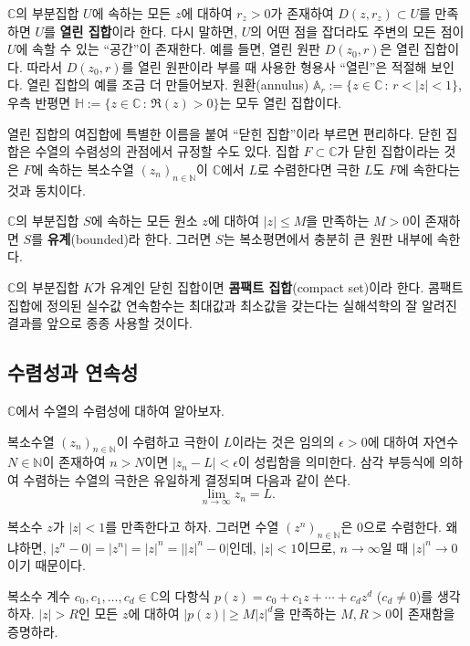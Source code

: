 $\mathbb C$의 부분집합 $U$에 속하는
모든 $z$에 대하여 $r_z>0$가 존재하여 $D(z,r_z)\subset U$를 만족하면
$U$를 {\bf 열린 집합}이라 한다.
다시 말하면, $U$의 어떤 점을 잡더라도 
주변의 모든 점이 $U$에 속할 수 있는 ``공간''이 존재한다.
예를 들면, 열린 원판 $D(z_0,r)$은 열린 집합이다.
따라서  $D(z_0,r)$를 열린 원판이라 부를 때 사용한 형용사 ``열린''은 적절해 보인다.
열린 집합의 예를 조금 더 만들어보자.
원환(annulus) $\mathbb A_r := \{ z\in\mathbb C\,:\, r<|z|<1\}$,
우측 반평면 $\mathbb H:= \{z\in\mathbb C\,:\, \Re(z)>0\}$는 모두 열린 집합이다.

열린 집합의 여집합에 특별한 이름을 붙여 ``닫힌 집합''이라 부르면 편리하다.
닫힌 집합은 수열의 수렴성의 관점에서 규정할 수도 있다.
집합 $F\subset \mathbb C$가 닫힌 집합이라는 것은
$F$에 속하는 복소수열 $(z_n)_{n\in\mathbb N}$이  $\mathbb C$에서 $L$로 수렴한다면
극한 $L$도 $F$에 속한다는 것과 동치이다.

$\mathbb C$의 부분집합 $S$에 속하는 모든 원소 $z$에 대하여
$|z|\le M$을 만족하는 $M>0$이 존재하면 $S$를 {\bf 유계}(bounded)라 한다.
그러면 $S$는 복소평면에서 충분히 큰 원판 내부에 속한다.

$\mathbb C$의 부분집합 $K$가 유계인 닫힌 집합이면 {\bf 콤팩트 집합}(compact set)이라 한다.
콤팩트 집합에 정의된 실수값 연속함수는 최대값과 최소값을 갖는다는
실해석학의 잘 알려진 결과를
앞으로 종종 사용할 것이다.

\subsection{수렴성과 연속성}

$\mathbb C$에서 수열의 수렴성에 대하여 알아보자.
 
복소수열 $(z_n)_{n\in\mathbb N}$이 수렴하고 극한이 $L$이라는 것은
임의의 $\epsilon>0$에 대하여 자연수 $N\in\mathbb N$이 존재하여
 $n>N$이면 $|z_n -L| < \epsilon$이 성립함을 의미한다.
삼각 부등식에 의하여 수렴하는 수열의 극한은 유일하게 결정되며
다음과 같이 쓴다.
$$
\lim_{n\to\infty} z_n = L.
$$

\begin{saltexample}[label=example-1-1]{}{}
복소수 $z$가 $|z|<1$를 만족한다고 하자.
그러면 수열 $(z^n)_{n\in\mathbb N}$은 $0$으로 수렴한다.
왜냐하면, $|z^n-0| = |z^n| = |z|^n = \big||z|^n-0\big|$인데,
$|z|<1$이므로, $n\to\infty$일 때 $|z|^n\to0$이기 때문이다.
\end{saltexample}

\begin{salt_exercise} \label{ex-1-24}
복소수 계수 $c_0, c_1, \ldots, c_d\in \mathbb C$의
다항식 $p(z)=c_0 + c_1z + \cdots + c_dz^d$ ($c_d\ne0$)를 생각하자.
$|z|>R$인 모든 $z$에 대하여 $|p(z)| \ge M|z|^d$을 만족하는
$M, R>0$이 존재함을 증명하라.
\end{salt_exercise}

